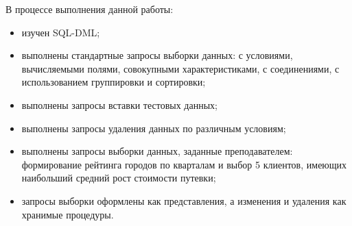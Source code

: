 В процессе выполнения данной работы:
\begin{itemize}
	\item изучен SQL-DML;
	\item выполнены стандартные запросы выборки данных: с условиями, вычисляемыми полями, совокупными характеристиками, с соединениями, с использованием группировки и сортировки;
	\item выполнены запросы вставки тестовых данных;
	\item выполнены запросы удаления данных по различным условиям;
	\item выполнены запросы выборки данных, заданные преподавателем: формирование рейтинга городов по кварталам и выбор 5 клиентов, имеющих наибольший средний рост стоимости путевки;
	\item запросы выборки оформлены как представления, а изменения и удаления как хранимые процедуры.
\end{itemize}




